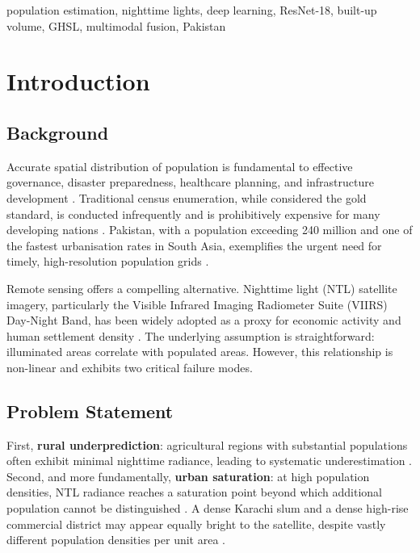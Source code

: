 \documentclass[conference]{IEEEtran}
\begin{document}
\begin{IEEEkeywords}
population estimation, nighttime lights, deep learning, ResNet-18, built-up volume, GHSL, multimodal fusion, Pakistan
\end{IEEEkeywords}

\section{Introduction}
\label{sec:introduction}

\subsection{Background}
\label{subsec:background}

Accurate spatial distribution of population is fundamental to effective governance, disaster preparedness, healthcare planning, and infrastructure development \cite{tatem2017worldpop}. Traditional census enumeration, while considered the gold standard, is conducted infrequently and is prohibitively expensive for many developing nations \cite{wardrop2018spatially}. Pakistan, with a population exceeding 240 million and one of the fastest urbanisation rates in South Asia, exemplifies the urgent need for timely, high-resolution population grids \cite{pbs2023census}.

Remote sensing offers a compelling alternative. Nighttime light (NTL) satellite imagery, particularly the Visible Infrared Imaging Radiometer Suite (VIIRS) Day-Night Band, has been widely adopted as a proxy for economic activity and human settlement density \cite{elvidge2017overview}. The underlying assumption is straightforward: illuminated areas correlate with populated areas. However, this relationship is non-linear and exhibits two critical failure modes.

\subsection{Problem Statement}
\label{subsec:problem}

First, \textbf{rural underprediction}: agricultural regions with substantial populations often exhibit minimal nighttime radiance, leading to systematic underestimation \cite{storeygard2016farther}. Second, and more fundamentally, \textbf{urban saturation}: at high population densities, NTL radiance reaches a saturation point beyond which additional population cannot be distinguished \cite{wu2023bvani}. A dense Karachi slum and a dense high-rise commercial district may appear equally bright to the satellite, despite vastly different population densities per unit area \cite{pesaresi2023ghsl}.
\end{document}
